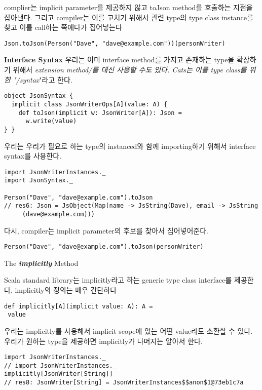 \documentclass[a4paper]{article}
\begin{document}
complier는 implicit parameter를 제공하지 않고 toJson method를 호출하는 지점을 잡아낸다. 그리고 compiler는 이를 고치기 위해서 관련 type의 type class instance를 찾고 이를 call하는 쪽에다가 집어넣는다

\begin{verbatim}
Json.toJson(Person("Dave", "dave@example.com"))(personWriter)
\end{verbatim}

\textbf{Interface Syntax}
우리는 이미 interface method를 가지고 존재하는 type을 확장하기 위해서 \emph{extension method/를 대신 사용할 수도 있다. Cats는 이를 type class를 위한 "/syntax}"라고 한다.

\begin{verbatim}
object JsonSyntax {
  implicit class JsonWriterOps[A](value: A) {
    def toJson(implicit w: JsonWriter[A]): Json =
      w.write(value)
} }
\end{verbatim}

우리는 우리가 필요로 하는 type의 instanced와 함께 importing하기 위해서 interface syntax를 사용한다.

\begin{verbatim}
import JsonWriterInstances._
import JsonSyntax._

Person("Dave", "dave@example.com").toJson
// res6: Json = JsObject(Map(name -> JsString(Dave), email -> JsString
     (dave@example.com)))
\end{verbatim}

다시, compiler는 implicit parameter의 후보를 찾아서 집어넣어준다.

\begin{verbatim}
Person("Dave", "dave@example.com").toJson(personWriter)
\end{verbatim}

The \emph{\textbf{implicitly}} Method

Scala standard library는 implicitly라고 하는 generic type class interface를 제공한다. implicitly의 정의는 매우 간단하다

\begin{verbatim}
def implicitly[A](implicit value: A): A =
 value
\end{verbatim}

우리는 implicitly를 사용해서 implicit scope에 있는 어떤 value라도 소환할 수 있다. 우리가 원하는 type을 제공하면 implicitly가 나머지는 알아서 한다.

\begin{verbatim}
import JsonWriterInstances._
// import JsonWriterInstances._
implicitly[JsonWriter[String]]
// res8: JsonWriter[String] = JsonWriterInstances$$anon$1@73eb1c7a
\end{verbatim}
\end{document}
